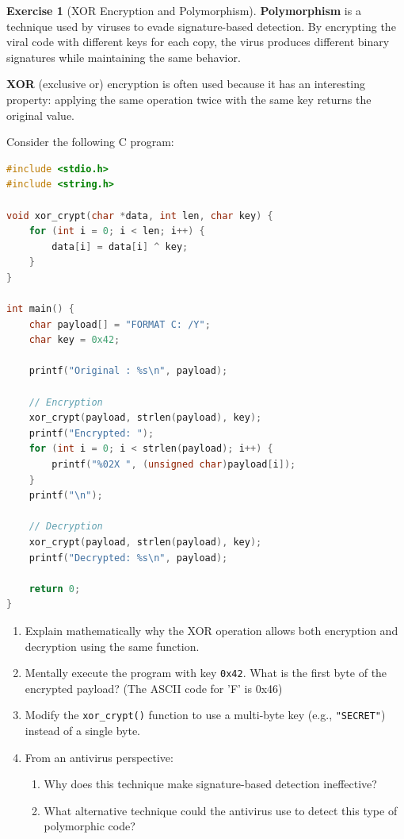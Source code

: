 \documentclass[a4paper,11pt]{article}
\theoremstyle{plain}
\theoremstyle{definition}
\newtheorem{exercice}{Exercise}
\begin{document}
\begin{exercice}[XOR Encryption and Polymorphism]

\textbf{Polymorphism} is a technique used by viruses to evade signature-based detection. By encrypting the viral code with different keys for each copy, the virus produces different binary signatures while maintaining the same behavior.

\textbf{XOR} (exclusive or) encryption is often used because it has an interesting property: applying the same operation twice with the same key returns the original value.

Consider the following C program:

\begin{lstlisting}[language=C]
#include <stdio.h>
#include <string.h>

void xor_crypt(char *data, int len, char key) {
    for (int i = 0; i < len; i++) {
        data[i] = data[i] ^ key;
    }
}

int main() {
    char payload[] = "FORMAT C: /Y";
    char key = 0x42;

    printf("Original : %s\n", payload);

    // Encryption
    xor_crypt(payload, strlen(payload), key);
    printf("Encrypted: ");
    for (int i = 0; i < strlen(payload); i++) {
        printf("%02X ", (unsigned char)payload[i]);
    }
    printf("\n");

    // Decryption
    xor_crypt(payload, strlen(payload), key);
    printf("Decrypted: %s\n", payload);

    return 0;
}
\end{lstlisting}

\begin{enumerate}
\item Explain mathematically why the XOR operation allows both encryption and decryption using the same function.

\item Mentally execute the program with key \texttt{0x42}. What is the first byte of the encrypted payload? (The ASCII code for 'F' is 0x46)

\item Modify the \texttt{xor\_crypt()} function to use a multi-byte key (e.g., \texttt{"SECRET"}) instead of a single byte.

\item From an antivirus perspective:
\begin{enumerate}
\item Why does this technique make signature-based detection ineffective?
\item What alternative technique could the antivirus use to detect this type of polymorphic code?
\end{enumerate}
\end{enumerate}

\end{exercice}
\end{document}
